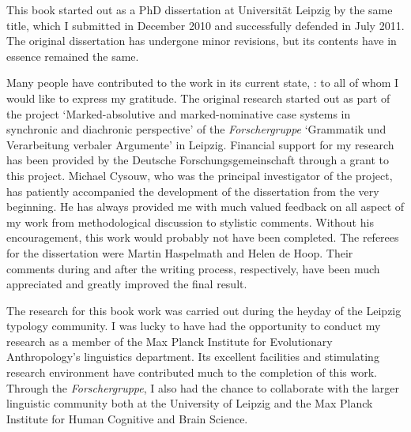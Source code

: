 

This book started out as a PhD dissertation at Universit\"at Leipzig by the same title, which I submitted in December 2010 and successfully defended in July 2011. 
The original dissertation has undergone minor revisions, but its contents have in essence remained the same.

Many people have contributed to the work in its current state, : to all of whom I would like to express my gratitude.
The original research started out as part of the  project `Marked-absolutive and marked-nominative case systems in synchronic and diachronic perspective' of the \textit{Forschergruppe} `Grammatik und Verarbeitung verbaler Argumente' in Leipzig. 
Financial support for my research has been provided by the Deutsche Forschungsgemeinschaft through a grant to this project.
Michael Cysouw, who was the principal investigator of the project, has patiently accompanied the development of the dissertation from the very beginning. 
He has always provided me with much valued feedback on all aspect of my work from methodological discussion to stylistic comments.  
Without his encouragement, this work would probably not have been completed.
The referees for the dissertation were Martin Haspelmath and Helen de Hoop.
Their comments during and after the writing process, respectively, have been much appreciated and greatly improved the final result. 
 
The research for this book work was carried out during the heyday of the Leipzig typology community.
I was lucky to have had the opportunity to conduct my research as a member of the Max Planck Institute for Evolutionary Anthropology's linguistics department.
Its excellent facilities and stimulating research environment have contributed much to the completion of this work. 
Through the \textit{Forschergruppe}, I also had the chance to collaborate with the larger linguistic community both at the University of Leipzig and the Max Planck Institute for Human Cognitive and Brain Science.

